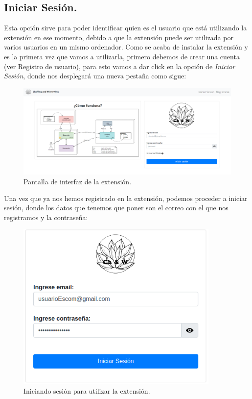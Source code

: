 \documentclass[12pt, a4paper, titlepage]{report}
\begin{document}
    	
        \subsection{Iniciar Sesión.}
        Esta opción sirve para poder identificar quien es el usuario que está utilizando la extensión en ese momento, debido a que la extensión puede ser utilizada por varios usuarios en un mismo ordenador. Como se acaba de instalar la extensión y es la primera vez que vamos a utilizarla, primero debemos de crear una cuenta (ver Registro de usuario), para esto vamos a dar click en la opción de \textit{Iniciar Sesión}, donde nos desplegará una nueva pestaña como sigue: 
        
        \begin{figure}[H]
    		\begin{center}	
    		\includegraphics[width=14cm]{./imagenes/Registro/UI_inicio.png}
    		\caption{Pantalla de interfaz de la extensión.}
    		\label{fig:UI_InicioExtension}
    		\end{center}
    	\end{figure}
    	
    	
    	
    	Una vez que ya nos hemos registrado en la extensión, podemos proceder a iniciar sesión, donde los datos que tenemos que poner son el correo con el que nos registramos y la contraseña: 
    	
    	\begin{figure}[H]
    		\begin{center}	
    		\includegraphics[width=10cm]{./imagenes/Inicio_sesion/Login.png}
    		\caption{Iniciando sesión para utilizar la extensión.}
    		\label{fig:Login}
    		\end{center}
    	\end{figure}
    	
\end{document}
